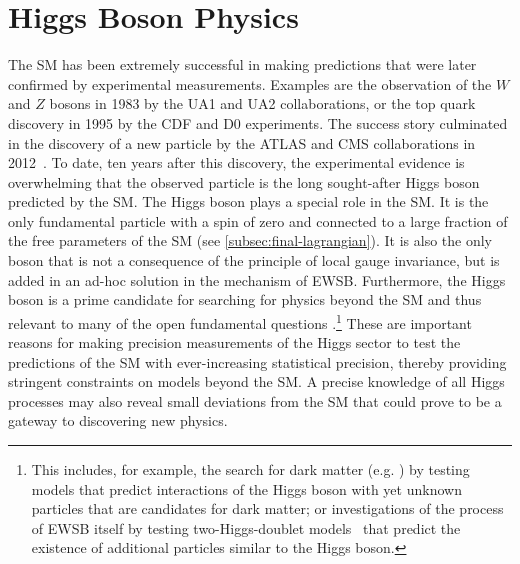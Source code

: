 \chapter{Higgs Boson Physics}
\label{chap:higgs}
The SM has been extremely successful in making predictions that were later confirmed by experimental measurements. Examples are the observation of the $W$ and $Z$ bosons in 1983 by the UA1 and UA2 collaborations, or the top quark discovery in 1995 by the CDF and D0 experiments. 
The success story culminated in the discovery of a new particle by the ATLAS and CMS collaborations in 2012~\cite{HIGG-2012-27,CMS-HIG-12-028}. To date, ten years after this discovery, the experimental evidence is overwhelming that the observed particle is the long sought-after Higgs boson predicted by the SM.
The Higgs boson plays a special role in the SM. 
It is the only fundamental particle with a spin of zero and connected to a large fraction of the free parameters of the SM (see \cref{subsec:final-lagrangian}). It is also the only boson that is not a consequence of the principle of local gauge invariance, but is added in an ad-hoc solution in the mechanism of EWSB. 
Furthermore, the Higgs boson is a prime candidate for searching for physics beyond the SM and thus relevant to many of the open fundamental questions \cite{2019BHeinemann}.\footnote{This includes, for example, the search for dark matter (e.g. ) by testing models that predict interactions of the Higgs boson with yet unknown particles that are candidates for dark matter; or investigations of the process of EWSB itself by testing two-Higgs-doublet models~\cite{Branco_2012} that predict the existence of additional particles similar to the Higgs boson.}
These are important reasons for making precision measurements of the Higgs sector to test the predictions of the SM with ever-increasing statistical precision, thereby providing stringent constraints on models beyond the SM.
A precise knowledge of all Higgs processes may also reveal small deviations from the SM that could prove to be a gateway to discovering new physics. 

